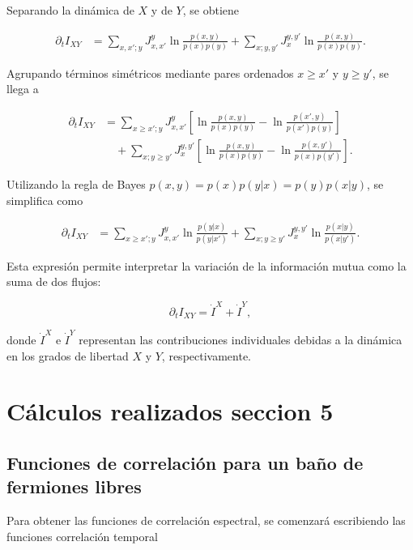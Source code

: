 \begin{appendixs}
Separando la dinámica de \(X\) y de \(Y\), se obtiene

\begin{align*}
    \partial_{t} I_{XY} &= \sum_{x,x';y} J_{x,x'}^{y} \ln \frac{p(x,y)}{p(x)p(y)} 
    + \sum_{x;y,y'} J_{x}^{y,y'} \ln \frac{p(x,y)}{p(x)p(y)}.
\end{align*}

Agrupando términos simétricos mediante pares ordenados \(x \geq x'\) y \(y \geq y'\), se llega a

\begin{align*}
    \partial_{t} I_{XY} &= \sum_{x \geq x';y} J_{x,x'}^{y} \left[ \ln \frac{p(x,y)}{p(x)p(y)} - \ln \frac{p(x',y)}{p(x')p(y)} \right] \nonumber \\
    &\quad + \sum_{x;y \geq y'} J_{x}^{y,y'} \left[ \ln \frac{p(x,y)}{p(x)p(y)} - \ln \frac{p(x,y')}{p(x)p(y')} \right].
\end{align*}

Utilizando la regla de Bayes \(p(x,y) = p(x)p(y|x) = p(y)p(x|y)\), se simplifica como

\begin{align*}
    \partial_{t} I_{XY} 
    &= \sum_{x \geq x';y} J_{x,x'}^{y} \ln \frac{p(y|x)}{p(y|x')} 
     + \sum_{x;y \geq y'} J_{x}^{y,y'} \ln \frac{p(x|y)}{p(x|y')}.
\end{align*}

Esta expresión permite interpretar la variación de la información mutua como la suma de dos flujos:

\begin{equation*}
    \partial_{t} I_{XY} = \dot{I}^{X} + \dot{I}^{Y},
\end{equation*}

donde \(\dot{I}^{X}\) e \(\dot{I}^{Y}\) representan las contribuciones individuales debidas a la dinámica en los grados de libertad \(X\) y \(Y\), respectivamente.


    \label{apendix4:secondlaw}


\newpage

\section{Cálculos realizados seccion 5}
\subsection{Funciones de correlación para un baño de fermiones libres}
Para obtener las funciones de correlación espectral, se comenzará escribiendo las funciones correlación temporal 


\end{appendixs}
